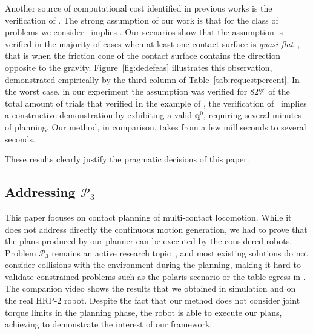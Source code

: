 Another source of computational cost identified in previous works is the verification of \equilibriumfeasibility. 
The strong assumption of our work is that for the class of problems we consider \contactreachability\ implies \equilibriumfeasibility.
Our scenarios show that the  assumption is verified in the majority of cases when at least one contact surface is \textit{quasi flat}~\cite{Prete2016}, that is when
the friction cone of the contact surface contains the direction opposite to the gravity.
Figure~\ref{fig:dedefeas} illustrates this observation, demonstrated empirically by the third column of Table~\ref{tab:requestpercent}. In the worst case, in our experiment
the assumption was verified for 82\% of the total amount of trials that verified \contactreachability\.
In the example of \cite{Bouyarmane2009}, the verification of \equilibriumfeasibility\ implies a constructive demonstration by exhibiting a valid $\mathbf{q}^{\overline{0}}$, requiring
several minutes of planning. Our method, in comparison, takes from a few milliseconds to several seconds.

These results clearly justify the pragmatic decisions of this paper.

\subsection{Addressing $\mathcal{P}_3$}
This paper focuses on contact planning of multi-contact locomotion. While it does not address directly the continuous motion generation,
we had to prove that the plans produced by our planner can be executed by the considered robots. Problem $\mathcal{P}_3$ remains an active research topic~\cite{Carpentier2016, herzog2015trajectory},
and most existing solutions do not consider collisions with the environment during the planning, making it hard to validate constrained problems such as the polaris scenario
or the table egress in \cite{DBLP:conf/iser/EscandeKMG08}.
The companion video shows the results that we obtained in simulation and on the real HRP-2 robot. Despite the fact that our method does not consider joint torque limits in the planning
phase, the robot is able to execute our plans, achieving to demonstrate the interest of our framework.

